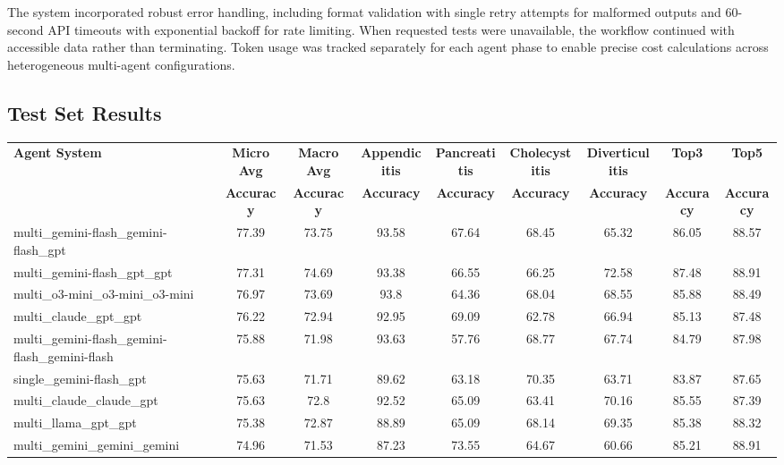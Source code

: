\documentclass[manuscript, nonacm]{acmart}
\begin{document}
The system incorporated robust error handling, including format validation with single retry attempts for malformed outputs and 60-second API timeouts with exponential backoff for rate limiting. When requested tests were unavailable, the workflow continued with accessible data rather than terminating. Token usage was tracked separately for each agent phase to enable precise cost calculations across heterogeneous multi-agent configurations.

\subsection{Test Set Results}
\label{sec:test}

\begin{table}[h!]
\centering
\footnotesize
\begin{tabular}{|l|c|c|c|c|c|c|c|c|}
\hline
\textbf{Agent System} & \textbf{Micro Avg} & \textbf{Macro Avg} & \textbf{Appendicitis} & \textbf{Pancreatitis} & \textbf{Cholecystitis} & \textbf{Diverticulitis} & \textbf{Top3} & \textbf{Top5} \\
 & \textbf{Accuracy} & \textbf{Accuracy} & \textbf{Accuracy} & \textbf{Accuracy} & \textbf{Accuracy} & \textbf{Accuracy} & \textbf{Accuracy} & \textbf{Accuracy} \\
\hline
multi\_gemini-flash\_gemini-flash\_gpt & 77.39 & 73.75 & 93.58 & 67.64 & 68.45 & 65.32 & 86.05 & 88.57 \\
\hline
multi\_gemini-flash\_gpt\_gpt & 77.31 & 74.69 & 93.38 & 66.55 & 66.25 & 72.58 & 87.48 & 88.91 \\
\hline
multi\_o3-mini\_o3-mini\_o3-mini & 76.97 & 73.69 & 93.8 & 64.36 & 68.04 & 68.55 & 85.88 & 88.49 \\
\hline
multi\_claude\_gpt\_gpt & 76.22 & 72.94 & 92.95 & 69.09 & 62.78 & 66.94 & 85.13 & 87.48 \\
\hline
multi\_gemini-flash\_gemini-flash\_gemini-flash & 75.88 & 71.98 & 93.63 & 57.76 & 68.77 & 67.74 & 84.79 & 87.98 \\
\hline
single\_gemini-flash\_gpt & 75.63 & 71.71 & 89.62 & 63.18 & 70.35 & 63.71 & 83.87 & 87.65 \\
\hline
multi\_claude\_claude\_gpt & 75.63 & 72.8 & 92.52 & 65.09 & 63.41 & 70.16 & 85.55 & 87.39 \\
\hline
multi\_llama\_gpt\_gpt & 75.38 & 72.87 & 88.89 & 65.09 & 68.14 & 69.35 & 85.38 & 88.32 \\
\hline
multi\_gemini\_gemini\_gemini & 74.96 & 71.53 & 87.23 & 73.55 & 64.67 & 60.66 & 85.21 & 88.91 \\

\end{tabular}
\end{table}
\end{document}
